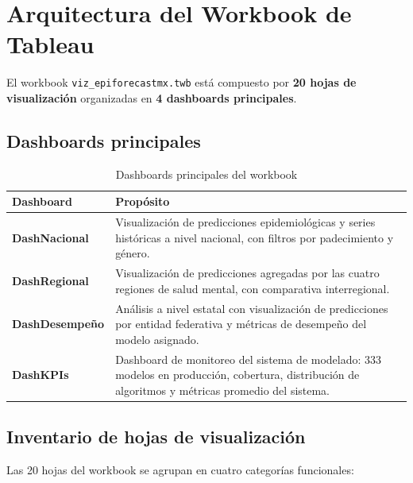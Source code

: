 \documentclass[12pt, letterpaper]{article}
\begin{document}
\newpage
\section{Arquitectura del Workbook de Tableau}\label{sec:workbook}

El workbook \texttt{viz\_epiforecastmx.twb} está compuesto por \textbf{20 hojas de visualización} organizadas en \textbf{4 dashboards principales}.

\subsection{Dashboards principales}

\begin{table}[H]
\centering
\caption{Dashboards principales del workbook}
\label{tab:dashboards}
\small
\begin{tabularx}{\textwidth}{>{\bfseries}l X}
\toprule
\textbf{Dashboard} & \textbf{Propósito} \\
\midrule
DashNacional   & Visualización de predicciones epidemiológicas y series históricas a nivel nacional, con filtros por padecimiento y género. \\
DashRegional   & Visualización de predicciones agregadas por las cuatro regiones de salud mental, con comparativa interregional. \\
DashDesempeño  & Análisis a nivel estatal con visualización de predicciones por entidad federativa y métricas de desempeño del modelo asignado. \\
DashKPIs       & Dashboard de monitoreo del sistema de modelado: 333 modelos en producción, cobertura, distribución de algoritmos y métricas promedio del sistema. \\
\bottomrule
\end{tabularx}
\end{table}

\subsection{Inventario de hojas de visualización}

Las 20 hojas del workbook se agrupan en cuatro categorías funcionales:
\end{document}
